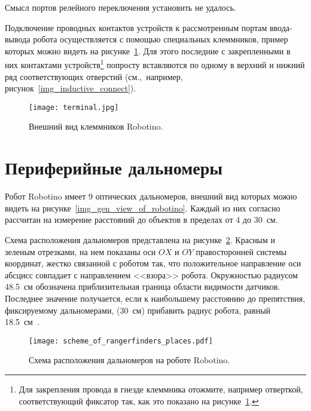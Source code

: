 Смысл портов релейного переключения установить не удалось.

Подключение проводных контактов устройств к рассмотренным портам ввода-вывода робота осуществляется с помощью специальных клеммников, пример которых можно видеть на рисунке~\ref{img_terminal}.
Для этого последние с закрепленными в них контактами устройств\footnote{Для закрепления провода в гнезде клеммника отожмите, например отверткой, соответствующий фиксатор так, как это показано на рисунке~\ref{img_terminal}.} попросту вставляются по одному в верхний и нижний ряд соответствующих отверстий (см.,~например, рисунок~\ref{img_inductive_connect}).

\begin{figure}[h]
	\centering
	\texttt{[image: terminal.jpg]}
	\caption{Внешний вид клеммников Robotino.}
	\label{img_terminal}
\end{figure}



\section{Периферийные дальномеры}
Робот Robotino имеет 9 оптических дальномеров, внешний вид которых можно видеть на рисунке~\ref{img_gen_view_of_robotino}.
Каждый из них согласно \cite[стр.~68]{main_manual} рассчитан на измерение расстояний до объектов в пределах от 4 до 30~см.

Схема расположения дальномеров представлена на рисунке~\ref{img_scheme_of_rangerfinders_places}.
Красным и зеленым отрезками, на нем показаны оси $OX$ и $OY$ правосторонней системы координат, жестко связанной с роботом так, что положительное направление оси абсцисс совпадает с направлением <<взора>> робота.
Окружностью радиусом 48.5~см обозначена приблизительная граница области видимости датчиков.
Последнее значение получается, если к наибольшему расстоянию до препятствия, фиксируемому дальномерами, (30~см) прибавить радиус робота, равный 18.5~см~\cite{festo_page_with_robotino_until_2013}.

\begin{figure}[h]
	\centering
	\texttt{[image: scheme\_of\_rangerfinders\_places.pdf]}
	\caption{Схема расположения дальномеров на роботе Robotino.}
	\label{img_scheme_of_rangerfinders_places}
\end{figure}
